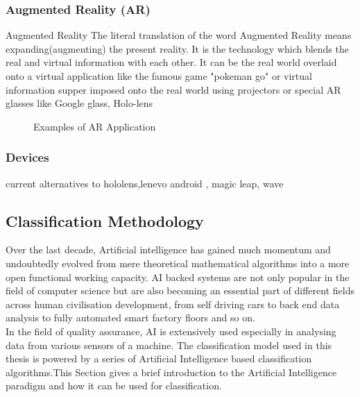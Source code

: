 \documentclass{article}
\begin{document}
\subsubsection{Augmented Reality (AR)}

Augmented Reality
The literal translation of the word Augmented Reality means expanding(augmenting) the present reality. It is the technology which blends the real and virtual information with each other. It can be the real world overlaid onto a virtual application like the famous game "pokeman go" or virtual information supper imposed onto the real world using projectors or special AR glasses like Google glass, Holo-lens


\begin{figure}
{}
{}
\caption{Examples of AR Application}

\label{fig: aRExample}
\end{figure}


\subsubsection{Devices}
    current alternatives to hololens,lenevo android , magic leap, wave 


\subsection{Classification Methodology}

Over the last decade, Artificial intelligence has gained much momentum and undoubtedly evolved from mere theoretical mathematical algorithms into a more open functional working capacity. AI backed systems are not only popular in the field of computer science but are also becoming an essential part of different fields across human civilisation development, from self driving cars to back end data analysis to fully automated smart factory floors and so on.\\

In the field of quality assurance, AI is extensively used especially in analysing data from various sensors of a machine. The classification model used in this thesis is powered by a series of Artificial Intelligence based classification algorithms.This Section gives a brief introduction to the Artificial Intelligence paradigm and how it can be used for classification. \\
\end{document}
